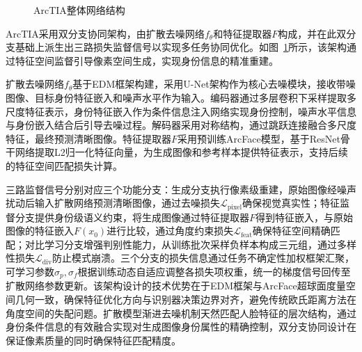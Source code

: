 \begin{figure}[!htbp]
  \caption{ArcTIA整体网络结构}
  \label{fig:tia_architecture}
\end{figure}

ArcTIA采用双分支协同架构，由扩散去噪网络$f_\theta$和特征提取器$F$构成，并在此双分支基础上派生出三路损失监督信号以实现多任务协同优化。如图~\ref{fig:tia_architecture}所示，该架构通过特征空间监督引导像素空间生成，实现身份信息的精准重建。

扩散去噪网络$f_\theta$基于EDM框架构建，采用U-Net架构作为核心去噪模块，接收带噪图像、目标身份特征嵌入和噪声水平作为输入。编码器通过多层卷积下采样提取多尺度特征表示，身份特征嵌入作为条件信息注入网络实现身份控制，噪声水平信息与身份嵌入结合后引导去噪过程。解码器采用对称结构，通过跳跃连接融合多尺度特征，最终预测清晰图像。特征提取器$F$采用预训练ArcFace模型，基于ResNet骨干网络提取L2归一化特征向量，为生成图像和参考样本提供特征表示，支持后续的特征空间匹配损失计算。

三路监督信号分别对应三个功能分支：生成分支执行像素级重建，原始图像经噪声扰动后输入扩散网络预测清晰图像，通过去噪损失$\mathcal{L}_{\text{pixel}}$确保视觉真实性；特征监督分支提供身份级语义约束，将生成图像通过特征提取器$F$得到特征嵌入，与原始图像的特征嵌入$F(x_0)$进行比较，通过角度约束损失$\mathcal{L}_{\text{feat}}$确保特征空间精确匹配；对比学习分支增强判别性能力，从训练批次采样负样本构成三元组，通过多样性损失$\mathcal{L}_{\text{div}}$防止模式崩溃。三个分支的损失信息通过任务不确定性加权框架汇聚，可学习参数$\sigma_p, \sigma_f$根据训练动态自适应调整各损失项权重，统一的梯度信号回传至扩散网络参数更新。该架构设计的技术优势在于EDM框架与ArcFace超球面度量空间几何一致，确保特征优化方向与识别器决策边界对齐，避免传统欧氏距离方法在角度空间的失配问题。扩散模型渐进去噪机制天然匹配人脸特征的层次结构，通过身份条件信息的有效融合实现对生成图像身份属性的精确控制，双分支协同设计在保证像素质量的同时确保特征匹配精度。

